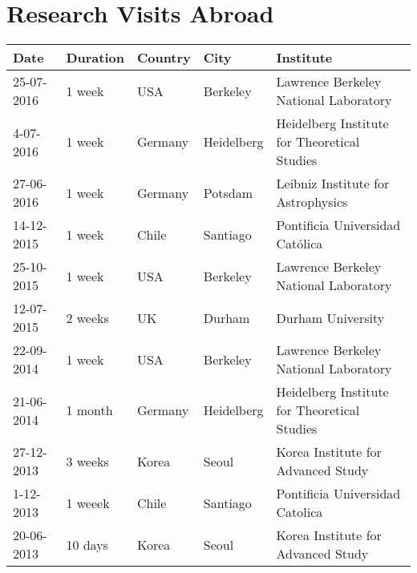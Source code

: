 \documentclass{report}
\begin{document}
\section*{Research Visits Abroad}

\begin{tabular}{p{2.0cm} p{1.5cm} p{1.5cm} p{1.5cm} p{5.5cm}}\hline
Date & Duration & Country & City & Institute\\\hline
25-07-2016 & 1 week & USA & Berkeley & Lawrence Berkeley National Laboratory\\
4-07-2016 & 1 week & Germany & Heidelberg & Heidelberg Institute for Theoretical Studies \\
27-06-2016 & 1 week & Germany & Potsdam & Leibniz Institute for Astrophysics \\
14-12-2015 & 1 week & Chile & Santiago & Pontificia Universidad Cat\'olica\\
25-10-2015 & 1 week & USA & Berkeley & Lawrence Berkeley National Laboratory\\
12-07-2015 & 2 weeks & UK & Durham & Durham University\\
22-09-2014 & 1 week & USA & Berkeley & Lawrence Berkeley National Laboratory\\ 
21-06-2014 & 1 month & Germany & Heidelberg & Heidelberg Institute for Theoretical Studies \\
27-12-2013 & 3 weeks & Korea & Seoul & Korea Institute for Advanced Study\\
1-12-2013 & 1 weeek & Chile & Santiago & Pontificia Universidad Catolica\\
20-06-2013 & 10 days & Korea & Seoul & Korea Institute for Advanced Study\\\hline
\end{tabular}
\end{document}
